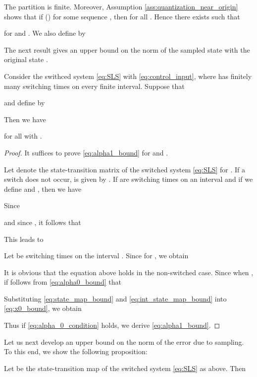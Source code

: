 \documentclass[a4, 11pt]{article}
\begin{document}
The partition  is finite. 
Moreover, 
Assumption \ref{ass:quantization_near_origin} shows that
if  () for some sequence ,
then  for all .
Hence
there exists  such that

for  and .
We also define  by 


The next result gives an upper bound on
the norm of the sampled state  with
the original state .

\begin{lemma}
\label{lem:alpha1_bound}
Consider the swithced system \eqref{eq:SLS} with
\eqref{eq:control_input}, where  has finitely many switching times
on every finite interval.
Suppose that

and define  by

Then 
we have

for all  with 
.
\end{lemma}
\begin{proof}
It suffices to prove \eqref{eq:alpha1_bound} for
 and 
.

Let  denote the state-transition matrix of 
the switched system \eqref{eq:SLS}
for .
If a switch does not occur,  is given by 
.
If  are switching times on an interval 
and if we define  and , then
we have

Since

and since , it follows that

This leads to

Let  be switching times on the interval .
Since  for ,
we obtain

It is obvious that the equation above holds in the non-switched case.
Since  when , 
if follows from \eqref{eq:alpha0_bound} that

Substituting \eqref{eq:state_map_bound} and \eqref{eq:int_state_map_bound}
into \eqref{eq:x0_bound},
we obtain

Thus if \eqref{eq:alpha_0_condition} holds, we derive
\eqref{eq:alpha1_bound}.
\end{proof}


Let us next develop an upper bound on the norm of
the error  due to sampling.
To this end, 
we show the following proposition:
\begin{proposition}
\label{prop:state_transition_bound}
Let  be the state-transition map of 
the switched system \eqref{eq:SLS}
as above. Then

\end{proposition}
\end{document}
